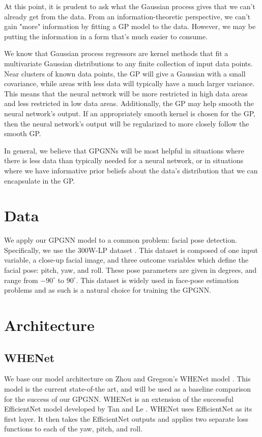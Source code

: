 \documentclass[11pt,letterpaper]{article}
\begin{document}
At this point, it is prudent to ask what the Gaussian process gives that we can't already get from the data.
From an information-theoretic perspective, we can't gain "more" information by fitting a GP model to the data.
However, we may be putting the information in a form that's much easier to consume.

We know that Gaussian process regressors are kernel methods that fit a multivariate Gaussian distributions to any finite collection of input data points.
Near clusters of known data points, the GP will give a Gaussian with a small covariance, while areas with less data will typically have a much larger variance.
This means that the neural network will be more restricted in high data areas and less restricted in low data areas.
Additionally, the GP may help smooth the neural network's output.
If an appropriately smooth kernel is chosen for the GP, then the neural network's output will be regularized to more closely follow the smooth GP.

In general, we believe that GPGNNs will be most helpful in situations where there is less data than typically needed for a neural network, or in situations where we have informative prior beliefs about the data's distribution that we can encapsulate in the GP.

\section{Data}
  We apply our GPGNN model to a common problem: facial pose detection. Specifically, we use the 300W-LP dataset \cite{300wlp}. This dataset is composed of one input variable, a close-up facial image, and three outcome variables which define the facial pose: pitch, yaw, and roll. These pose parameters are given in degrees, and range from $-90^{\circ}$ to $90^{\circ}$. This dataset is widely used in face-pose estimation problems and as such is a natural choice for training the GPGNN.

\section{Architecture}
  \subsection{WHENet}
    We base our model architecture on Zhou and Gregson's WHENet model \cite{whenet}. This model is the current state-of-the art, and will be used as a baseline comparison for the success of our GPGNN. WHENet is an extension of the successful EfficientNet model developed by Tan and Le \cite{efn}. WHENet uses EfficientNet as its first layer. It then takes the EfficientNet outputs and applies two separate loss functions to each of the yaw, pitch, and roll.
\end{document}

